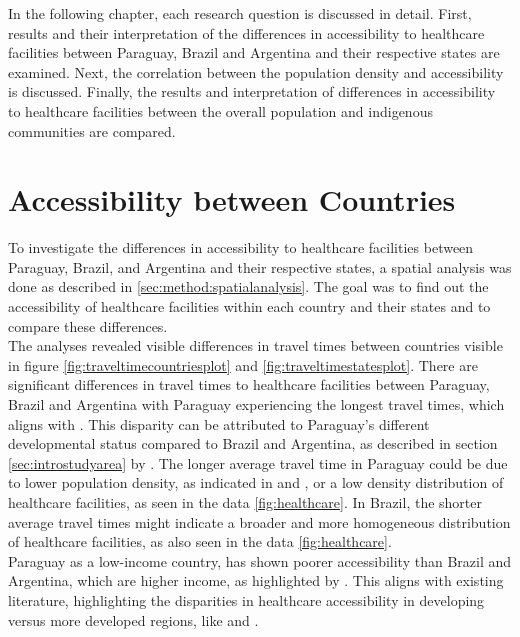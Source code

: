 \documentclass[11pt, a4paper]{report}
\begin{document}

In the following chapter, each research question is discussed in detail. First, results and their interpretation of the differences in accessibility to healthcare facilities between Paraguay, Brazil and Argentina and their respective states are examined. Next, the correlation between the population density and accessibility is discussed. Finally, the results and interpretation of differences in accessibility to healthcare facilities between the overall population and indigenous communities are compared.

\section{Accessibility between Countries}

To investigate the differences in accessibility to healthcare facilities between Paraguay, Brazil, and Argentina and their respective states, a spatial analysis was done as described in \ref{sec:method:spatialanalysis}. The goal was to find out the accessibility of healthcare facilities within each country and their states and to compare these differences. \\
%
The analyses revealed visible differences in travel times between countries visible in figure \ref{fig:traveltimecountriesplot} and \ref{fig:traveltimestatesplot}. There are significant differences in travel times to healthcare facilities between Paraguay, Brazil and Argentina with Paraguay experiencing the longest travel times, which aligns with \citet{gbd_2016_healthcare_access_and_quality_collaborators_measuring_2018}. This disparity can be attributed to Paraguay's different developmental status compared to Brazil and Argentina, as described in section \ref{sec:introstudyarea} by \citet{world_bank_world_2022}. The longer average travel time in Paraguay could be due to lower population density, as indicated in \citet{european_commission_joint_research_centre_global_2021} and \citet{united_nations_world_2022}, or a low density distribution of healthcare facilities, as seen in the data \ref{fig:healthcare}. In Brazil, the shorter average travel times might indicate a broader and more homogeneous distribution of healthcare facilities, as also seen in the data \ref{fig:healthcare}. \\
%
Paraguay as a low-income country, has shown poorer accessibility than Brazil and Argentina, which are higher income, as highlighted by \citet{world_bank_world_2022}. This aligns with existing literature, highlighting the disparities in healthcare accessibility in developing versus more developed regions, like \citet{mcintyre_access_2009} and \citet{de_siqueira_filha_economics_2022}. \\
\end{document}
